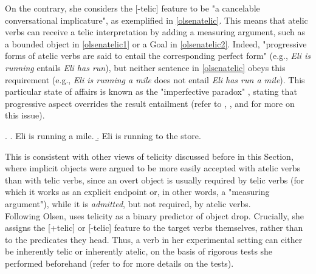 On the contrary, she considers the [-telic] feature to be "a cancelable conversational implicature", as exemplified in \ref{olsenatelic}. This means that atelic verbs can receive a telic interpretation by adding a measuring argument, such as a bounded object in \ref{olsenatelic1} or a Goal in \ref{olsenatelic2}. Indeed, "progressive forms of atelic verbs are said to entail the corresponding perfect form" (e.g., \textit{Eli is running} entails \textit{Eli has run}), but neither sentence in \ref{olsenatelic} obeys this requirement (e.g., \textit{Eli is running a mile} does not entail \textit{Eli has run a mile}). This particular state of affairs is known as the "imperfective paradox" \parencite{dowty2012word1979, white1993imperfective}, stating that progressive aspect overrides the result entailment (refer to \textcite{CopleyHarley2015force}, \textcite[115]{Dvorak2017thesis}, and \textcite{Melchin2019} for more on this issue).

\ex. \label{olsenatelic} \a. \label{olsenatelic1} Eli is running a mile.
\b. \label{olsenatelic2} Eli is running to the store.

This is consistent with other views of telicity discussed before in this Section, where implicit objects were argued to be more easily accepted with atelic verbs than with telic verbs, since an overt object is usually required by telic verbs (for which it works as an explicit endpoint or, in other words, a "measuring argument"), while it is \textit{admitted}, but not required, by atelic verbs.\\
Following Olsen, \textcite{Medina2007} uses telicity as a binary predictor of object drop. Crucially, she assigns the [+telic] or [-telic] feature to the target verbs themselves, rather than to the predicates they head. Thus, a verb in her experimental setting can either be inherently telic or inherently atelic, on the basis of rigorous tests she performed beforehand (refer to  for more details on the tests).


